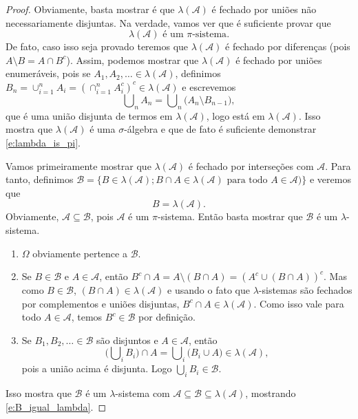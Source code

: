 \documentclass[reqno, draft]{book}
\newcommand*\1{\mathds{1}}
\DeclareMathOperator*{\mcup}{{\textstyle \bigcup}}
\begin{document}
\begin{proof}
  Obviamente, basta mostrar é que $\lambda(\mathcal{A})$ é fechado por uniões não necessariamente disjuntas.
  Na verdade, vamos ver que é suficiente provar que
  \begin{equation}
    \label{e:lambda_is_pi}
    \lambda(\mathcal{A}) \text{ é um $\pi$-sistema}.
  \end{equation}
  De fato, caso isso seja provado teremos que $\lambda(\mathcal{A})$ é fechado por diferenças (pois $A \setminus B = A \cap B^c$).
  Assim, podemos mostrar que $\lambda(\mathcal{A})$ é fechado por uniões enumeráveis, pois se $A_1, A_2, \dots \in \lambda(\mathcal{A})$, definimos $B_n = \cup_{i=1}^n A_i = (\cap_{i=1}^n A_i^c)^c \in \lambda(\mathcal{A})$ e escrevemos
  \begin{equation}
    \mcup_n A_n = \mcup_n \big(A_n \setminus B_{n-1} \big),
  \end{equation}
  que é uma união disjunta de termos em $\lambda(\mathcal{A})$, logo está em $\lambda(\mathcal{A})$.
  Isso mostra que $\lambda(\mathcal{A})$ é uma $\sigma$-álgebra e que de fato é suficiente demonstrar \eqref{e:lambda_is_pi}.

  Vamos primeiramente mostrar que $\lambda(\mathcal{A})$ é fechado por interseções com $\mathcal{A}$.
  Para tanto, definimos $\mathcal{B} = \big\{B \in \lambda(\mathcal{A}); \text{$B \cap A \in \lambda(\mathcal{A})$ para todo $A \in \mathcal{A}$})\big\}$ e veremos que
  \begin{equation}
    \label{e:B_igual_lambda}
    B = \lambda(\mathcal{A}).
  \end{equation}
  Obviamente, $\mathcal{A} \subseteq \mathcal{B}$, pois $\mathcal{A}$ é um $\pi$-sistema.
  Então basta mostrar que $\mathcal{B}$ é um $\lambda$-sistema.
  \begin{enumerate}[\quad a)]
  \item $\Omega$ obviamente pertence a $\mathcal{B}$.
  \item Se $B \in \mathcal{B}$ e $A \in \mathcal{A}$, então $B^c \cap A = A \setminus(B \cap A) = (A^c \cup (B \cap A))^c$.
    Mas como $B \in \mathcal{B}$, $(B \cap A) \in \lambda(\mathcal{A})$ e usando o fato que $\lambda$-sistemas são fechados por complementos e uniões disjuntas, $B^c \cap A \in \lambda(\mathcal{A})$.
    Como isso vale para todo $A \in \mathcal{A}$, temos $B^c \in \mathcal{B}$ por definição.
  \item Se $B_1, B_2, \dots \in \mathcal{B}$ são disjuntos e $A \in \mathcal{A}$, então
    \begin{equation}
      \big(\mcup\nolimits_i B_i \big) \cap A = \mcup_i \big(B_i \cup A\big) \in \lambda(\mathcal{A}),
    \end{equation}
    pois a união acima é disjunta.
    Logo $\mcup_i B_i \in \mathcal{B}$.
  \end{enumerate}
  Isso mostra que $\mathcal{B}$ é um $\lambda$-sistema com $\mathcal{A} \subseteq \mathcal{B} \subseteq \lambda(\mathcal{A})$, mostrando \eqref{e:B_igual_lambda}.


\end{proof}
\end{document}
